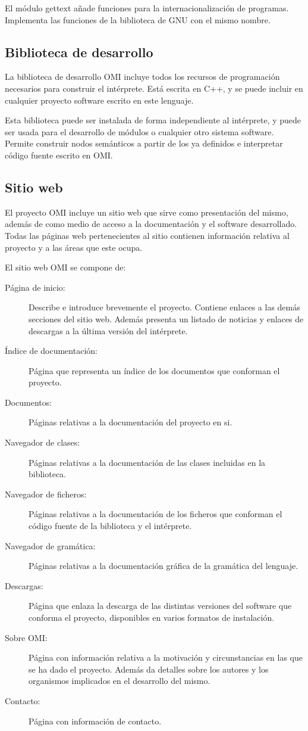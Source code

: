 El módulo gettext añade funciones para la internacionalización de programas. Implementa las funciones de la biblioteca de GNU
con el mismo nombre.

\subsection{Biblioteca de desarrollo}
La biblioteca de desarrollo OMI incluye todos los recursos de programación necesarios para construir el intérprete. 
Está escrita en C++, y se puede incluir en cualquier proyecto software escrito en este lenguaje.  

Esta biblioteca puede ser instalada de forma independiente al intérprete, y puede ser usada para el desarrollo de 
módulos o cualquier otro sistema software. Permite construir nodos semánticos a partir de los ya definidos e 
interpretar código fuente escrito en OMI.

\subsection{Sitio web}
El proyecto OMI incluye un sitio web que sirve como presentación del mismo, además de como medio de acceso a la documentación 
y el software desarrollado. Todas las páginas web pertenecientes al sitio contienen información relativa al proyecto y a las áreas que este
ocupa. 

El sitio web OMI se compone de: 

\begin{description}
\item [Página de inicio:] Describe e introduce brevemente el proyecto. Contiene enlaces a las demás secciones del sitio web. Además presenta un
listado de noticias y enlaces de descargas a la última versión del intérprete.
\item [Índice de documentación:] Página que representa un índice de los documentos que conforman el proyecto.
\item [Documentos:] Páginas relativas a la documentación del proyecto en si.
\item [Navegador de clases:] Páginas relativas a la documentación de las clases incluidas en la biblioteca. 
\item [Navegador de ficheros:] Páginas relativas a la documentación de los ficheros que conforman 
el código fuente de la biblioteca y el intérprete.
\item [Navegador de gramática:] Páginas relativas a la documentación gráfica de la gramática del lenguaje.
\item [Descargas:] Página que enlaza la descarga de las distintas versiones del software que conforma el proyecto, disponibles en varios formatos de instalación.
\item [Sobre OMI:] Página con información relativa a la motivación y circunstancias en las que se ha dado el proyecto. Además da detalles sobre los autores y los
organismos implicados en el desarrollo del mismo.
\item [Contacto:] Página con información de contacto.
\end{description}

